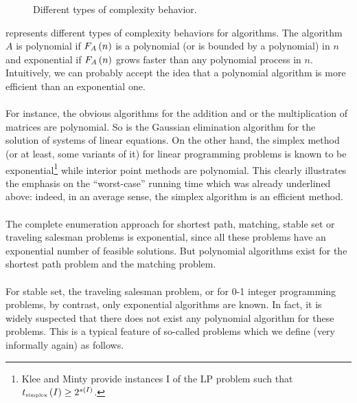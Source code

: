\begin{figure}[hbt]
\centering
{}
\caption{Different types of complexity behavior.}
\end{figure}

 represents different types of complexity behaviors for algorithms. The algorithm $A$ is polynomial if $F_A\left( n \right)$ is a polynomial (or is bounded by a polynomial) in $n$ and exponential if $F_A\left( n \right)$ grows faster than any polynomial process in $n$. Intuitively, we can probably accept the idea that a polynomial algorithm is more efficient than an exponential one.

\paragraph{}
For instance, the obvious algorithms for the addition and or the multiplication of matrices are polynomial. So is the Gaussian elimination algorithm for the solution of systems of linear equations. On the other hand, the simplex method (or at least, some variants of it) for linear programming problems is known to be exponential\footnote{Klee and Minty provide instances I of the LP problem such that $t_{\mbox{\tiny simplex}}\left( I \right)\geq 2^{s\left( I \right)}$.} while interior point methods are polynomial. This clearly illustrates the emphasis on the ``worst-case'' running time which was already underlined above: indeed, in an average sense, the simplex algorithm is an efficient method.

\paragraph{}
The complete enumeration approach for shortest path, matching, stable set or traveling salesman problems is exponential, since all these problems have an exponential number of feasible solutions. But polynomial algorithms exist for the shortest path problem and the matching problem.

\paragraph{}
For stable set, the traveling salesman problem, or for 0-1 integer programming problems, by contrast, only exponential algorithms are known. In fact, it is widely suspected that there does not exist any polynomial algorithm for these problems. This is a typical feature of so-called  problems which we define (very informally again) as follows.

